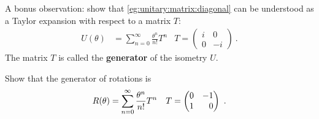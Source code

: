 \documentclass[12pt, oneside]{report}    %
\begin{document}
\begin{exercise}
A bonus observation: show that \eqref{eg:unitary:matrix:diagonal} can be understood as a Taylor expansion with respect to a matrix $T$:
\begin{align}
    U(\theta) &= \sum_{n=0}^\infty \frac{\theta^n}{n!} T^n
    &
    T=
    \begin{pmatrix}
        i & 0\\
        0 & -i
    \end{pmatrix} \ .
\end{align}
The matrix $T$ is called the \textbf{generator} of the isometry $U$. 
\end{exercise}


\begin{exercise}
Show that the generator of rotations is
\begin{align}
    R(\theta) &= \sum_{n=0}^\infty \frac{\theta^n}{n!} T^n
    &
    T=
    \begin{pmatrix}
        0 & -1\\
        1 & \pp 0
    \end{pmatrix} \ .
\end{align}
\end{exercise}


\end{document}

